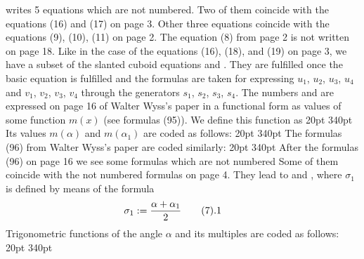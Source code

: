 writes 5 equations which are not numbered. Two of them coincide with the
equations (16) and (17) on page 3. Other three equations coincide with the
equations (9), (10), (11) on page 2. The equation (8) from page 2 is not 
written on page 18. Like in the case of the equations (16), (18), and (19)
on page 3, we have a subset of the slanted cuboid equations 
and . They are fulfilled once the basic equation 
is fulfilled and the formulas  are taken for expressing
$u_1$, $u_2$, $u_3$, $u_4$ and $v_1$, $v_2$, $v_3$, $v_4$ through the generators
$s_1$, $s_2$, $s_3$, $s_4$. The numbers  and  are
expressed on page 16 of Walter Wyss's paper  in a functional form as
values of some function $m(x)$ (see formulas (95)). We define this
function as
\medskip
{} 20pt 340pt
\noindent
{}
\medskip
\noindent
Its values $m(\alpha)$ and $m(\alpha_1)$ are coded as follows:
\medskip
{} 20pt 340pt
\noindent
{}
\medskip
\noindent
The formulas (96) from Walter Wyss's paper  are coded similarly:
\medskip
{} 20pt 340pt
\noindent
{}
\medskip
\noindent
After the formulas (96) on page 16 we see some formulas which are not numbered 
Some of them coincide with the not numbered formulas on page 4. They lead
to  and , where $\sigma_1$ is defined by means
of the formula
$$
\hskip -2em
\sigma_1:=\frac{\alpha+\alpha_1}{2}
\mytag{7.1}
$$
Trigonometric functions of the angle $\alpha$ and its multiples are coded as
follows:
\medskip
{} 20pt 340pt
\noindent
{}
